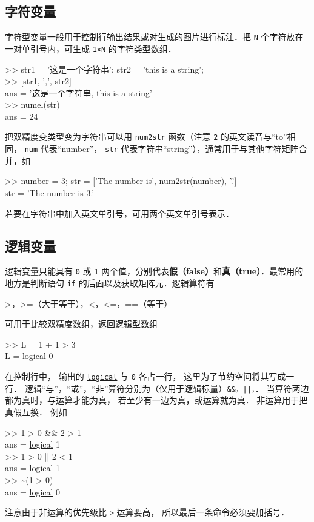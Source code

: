 \subsection{字符变量}

字符型变量一般用于控制行输出结果或对生成的图片进行标注．把 \texttt{N} 个字符放在一对单引号内，可生成 \texttt{1×N} 的字符类型数组．
\begin{Command}
>> str1 = {\color{string}'\!这是一个字符串'}; str2 = {\color{string}'this is a string'};\\
>> [str1, {\color{string}','}, str2] \\
ans = '\!这是一个字符串, this is a string'\\
>> numel(str) \\
ans = 24
\end{Command}
把双精度变类型变为字符串可以用 \texttt{num2str} 函数（注意 \texttt{2} 的英文读音与“to”相同， \texttt{num} 代表“number”， \texttt{str} 代表字符串“string”），通常用于与其他字符矩阵合并，如
\begin{Command}
>> number = 3; str = [{\color{string}'The number is'}, num2str(number), {\color{string}'.'}] \\
str = 'The number is 3.'
\end{Command}
若要在字符串中加入英文单引号，可用两个英文单引号表示．

\subsection{逻辑变量}

逻辑变量只能具有 \texttt{0} 或 \texttt{1} 两个值，分别代表\textbf{假（false）}和\textbf{真（true）}．最常用的地方是判断语句 \texttt{if} 的后面以及获取矩阵元．逻辑算符有
\begin{Command}
>，>=（大于等于），<，<=，==（等于）
\end{Command}
可用于比较双精度数组，返回逻辑型数组
\begin{Command}
>> L = 1 + 1 > 3 \\
L = {\color{blue}\underline{logical}} 0
\end{Command}
在控制行中， 输出的 \texttt{\color{blue}\underline{logical}} 与 \texttt{0} 各占一行， 这里为了节约空间将其写成一行． 逻辑“与”，“或”，“非”算符分别为（仅用于逻辑标量）\texttt{\&\&，||，\texttilde}． 当算符两边都为真时，与运算才能为真， 若至少有一边为真，或运算就为真． 非运算用于把真假互换． 例如
\begin{Command}
>> 1 > 0 \&\& 2 > 1 \\
ans = {\color{blue}\underline{logical}} 1\\
>> 1 > 0 || 2 < 1 \\
ans = {\color{blue}\underline{logical}} 1\\
>> \~ {}(1 > 0)\\
ans = {\color{blue}\underline{logical}} 0
\end{Command}
注意由于非运算的优先级比 \texttt{>} 运算要高， 所以最后一条命令必须要加括号．

